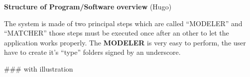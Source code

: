 \textbf{Structure of Program/Software overview} (Hugo) 

The system is made of two principal steps which are called “MODELER” and “MATCHER” those steps must be executed once after an other to let the application works properly.
The \textbf{MODELER} is very easy to perform, the user have to create it's “type” folders signed by an underscore.
    
### with illustration
    
    